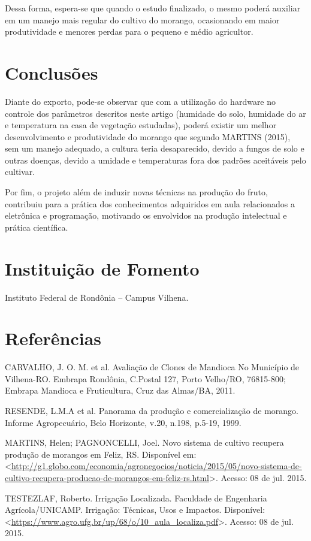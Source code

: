 \documentclass[article,12pt,onesidea,4paper,english,brazil]{abntex2}
\begin{document}
	Dessa forma, espera-se que quando o estudo finalizado, o mesmo poderá auxiliar em um manejo mais regular do cultivo do morango, ocasionando em maior produtividade e menores perdas para o pequeno e médio agricultor.
	
	\section*{Conclusões}
	
Diante do exporto, pode-se observar que com a utilização do hardware no controle dos parâmetros descritos neste artigo (humidade do solo, humidade do ar e temperatura na casa de vegetação estudadas), poderá existir um melhor desenvolvimento e produtividade do morango que segundo MARTINS (2015), sem um manejo adequado, a cultura teria desaparecido, devido a fungos de solo e outras doenças, devido a umidade e temperaturas fora dos padrões aceitáveis pelo cultivar.

Por fim, o projeto além de induzir novas técnicas na produção do fruto, contribuiu para a prática dos conhecimentos adquiridos em aula relacionados a eletrônica e programação, motivando os envolvidos na produção intelectual e prática científica.
	
	\section*{Instituição de Fomento}
	
	Instituto Federal de Rondônia – Campus Vilhena.
	
	\section*{Referências}
	
	\sloppy
	
	\noindent CARVALHO, J. O. M. et al. Avaliação de Clones de Mandioca No Município de Vilhena-RO. Embrapa Rondônia, C.Postal 127, Porto Velho/RO, 76815-800; Embrapa Mandioca e Fruticultura, Cruz das Almas/BA, 2011.
	
	\noindent RESENDE, L.M.A et al. Panorama da produção e comercialização de morango. Informe Agropecuário, Belo Horizonte, v.20, n.198, p.5-19, 1999.
	
	\noindent MARTINS, Helen; PAGNONCELLI, Joel. Novo sistema de cultivo recupera produção de morangos em Feliz, RS. Disponível em:
	<\url{http://g1.globo.com/economia/agronegocios/noticia/2015/05/novo-sistema-de-cultivo-recupera-producao-de-morangos-em-feliz-rs.html}>. Acesso: 08 de jul. 2015.
	
	\noindent TESTEZLAF, Roberto. Irrigação Localizada. Faculdade de Engenharia Agrícola/UNICAMP. Irrigação: Técnicas, Usos e Impactos. Disponível:
	<\url{https://www.agro.ufg.br/up/68/o/10\_aula\_localiza.pdf}>. Acesso: 08 de jul. 2015.
	
	
\end{document}
